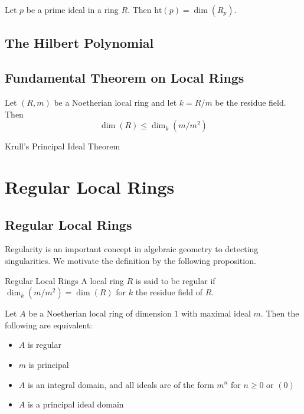 \documentclass[a4paper]{article}
\begin{document}
\begin{lmm}{}{} Let $p$ be a prime ideal in a ring $R$. Then $\text{ht}(p)=\dim(R_p)$. 
\end{lmm}

\subsection{The Hilbert Polynomial}

\subsection{Fundamental Theorem on Local Rings}
\begin{thm}{}{}
\end{thm}

\begin{prp}{}{} Let $(R,m)$ be a Noetherian local ring and let $k=R/m$ be the residue field. Then $$\dim(R)\leq\dim_k(m/m^2)$$
\end{prp}

\begin{thm}{Krull's Principal Ideal Theorem}{}
\end{thm}

\pagebreak
\section{Regular Local Rings}
\subsection{Regular Local Rings}
Regularity is an important concept in algebraic geometry to detecting singularities. We motivate the definition by the following proposition. 

\begin{defn}{Regular Local Rings}{} A local ring $R$ is said to be regular if $\dim_k(m/m^2)=\dim(R)$ for $k$ the residue field of $R$. 
\end{defn}

\begin{thm}{}{} Let $A$ be a Noetherian local ring of dimension $1$ with maximal ideal $m$. Then the following are equivalent: 
\begin{itemize}
\item $A$ is regular
\item $m$ is principal
\item $A$ is an integral domain, and all ideals are of the form $m^n$ for $n\geq 0$ or $(0)$
\item $A$ is a principal ideal domain
\end{itemize}
\end{thm}
\end{document}
